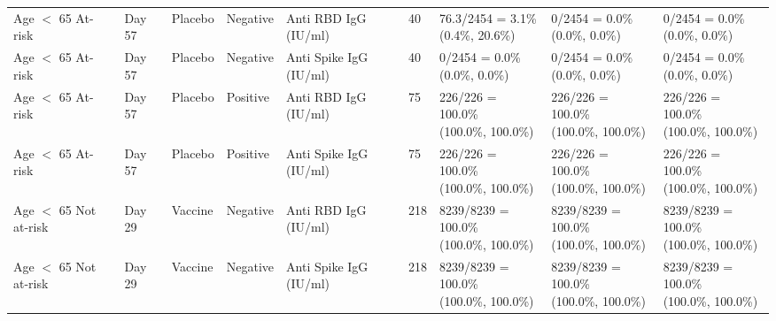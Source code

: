 \documentclass[]{book}
\theoremstyle{definition}
\theoremstyle{definition}
\theoremstyle{definition}
\newcommand{\1}{\mathbbm{1}}
\begin{document}
\begin{landscape}
\begin{ThreePartTable}
\begin{longtable}[t]{>{\raggedright\arraybackslash}p{2.7cm}llllllll}
\hspace{1em}Age $<$ 65 At-risk & Day 57 & Placebo & Negative & Anti RBD IgG (IU/ml) & 40 & \makecell[l]{76.3/2454 = 3.1\%\\(0.4\%, 20.6\%)} & \makecell[l]{0/2454 = 0.0\%\\(0.0\%, 0.0\%)} & \makecell[l]{0/2454 = 0.0\%\\(0.0\%, 0.0\%)}\\
\hspace{1em}Age $<$ 65 At-risk & Day 57 & Placebo & Negative & Anti Spike IgG (IU/ml) & 40 & \makecell[l]{0/2454 = 0.0\%\\(0.0\%, 0.0\%)} & \makecell[l]{0/2454 = 0.0\%\\(0.0\%, 0.0\%)} & \makecell[l]{0/2454 = 0.0\%\\(0.0\%, 0.0\%)}\\
\hspace{1em}Age $<$ 65 At-risk & Day 57 & Placebo & Positive & Anti RBD IgG (IU/ml) & 75 & \makecell[l]{226/226 = 100.0\%\\(100.0\%, 100.0\%)} & \makecell[l]{226/226 = 100.0\%\\(100.0\%, 100.0\%)} & \makecell[l]{226/226 = 100.0\%\\(100.0\%, 100.0\%)}\\
\hspace{1em}Age $<$ 65 At-risk & Day 57 & Placebo & Positive & Anti Spike IgG (IU/ml) & 75 & \makecell[l]{226/226 = 100.0\%\\(100.0\%, 100.0\%)} & \makecell[l]{226/226 = 100.0\%\\(100.0\%, 100.0\%)} & \makecell[l]{226/226 = 100.0\%\\(100.0\%, 100.0\%)}\\
\hspace{1em}Age $<$ 65 Not at-risk & Day 29 & Vaccine & Negative & Anti RBD IgG (IU/ml) & 218 & \makecell[l]{8239/8239 = 100.0\%\\(100.0\%, 100.0\%)} & \makecell[l]{8239/8239 = 100.0\%\\(100.0\%, 100.0\%)} & \makecell[l]{8239/8239 = 100.0\%\\(100.0\%, 100.0\%)}\\
\hspace{1em}Age $<$ 65 Not at-risk & Day 29 & Vaccine & Negative & Anti Spike IgG (IU/ml) & 218 & \makecell[l]{8239/8239 = 100.0\%\\(100.0\%, 100.0\%)} & \makecell[l]{8239/8239 = 100.0\%\\(100.0\%, 100.0\%)} & \makecell[l]{8239/8239 = 100.0\%\\(100.0\%, 100.0\%)}\\

\end{longtable}
\end{ThreePartTable}
\end{landscape}
\end{document}
